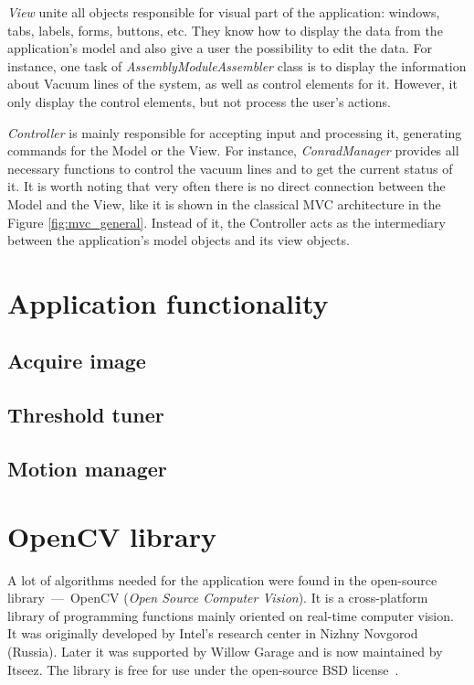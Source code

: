 \textit{View} unite all objects responsible for visual part of the application: windows, tabs, labels, forms, buttons, etc. They know how to display the data from the application's model and also give a user the possibility to edit the data. For instance, one task of \textit{AssemblyModuleAssembler} class is to display the information about Vacuum lines of the system, as well as control elements for it. However, it only display the control elements, but not process the user's actions.

\textit{Controller} is mainly responsible for accepting input and processing it, generating commands for the Model or the View. For instance, \textit{ConradManager} provides all necessary functions to control the vacuum lines and to get the current status of it. It is worth noting that very often there is no direct connection between the Model and the View, like it is shown in the classical MVC architecture in the Figure \ref{fig:mvc_general}. Instead of it, the Controller acts as the intermediary between the application's model objects and its view objects.

\section{Application functionality}

\subsection{Acquire image}

\subsection{Threshold tuner}

\subsection{Motion manager}

\section{OpenCV library}

A lot of algorithms needed for the application were found in the open-source library~---~OpenCV (\textit{Open Source Computer Vision}). It is a cross-platform library of programming functions mainly oriented on real-time computer vision. It was originally developed by Intel's research center in Nizhny Novgorod (Russia). Later it was supported by Willow Garage and is now maintained by Itseez. The library is free for use under the open-source BSD license~\cite{OpenCV_general}.

